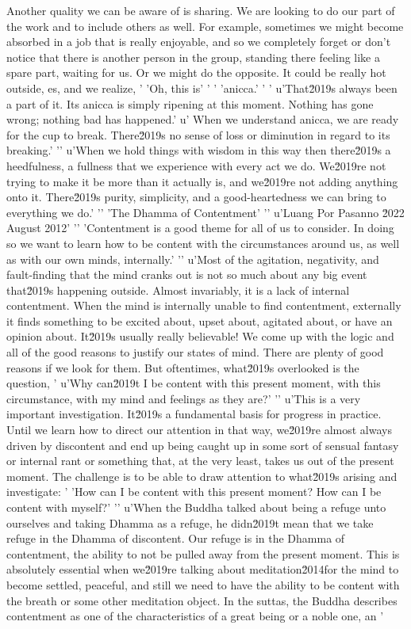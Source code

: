 Another quality we can be aware of is sharing. We are looking to do our 
part of the work and to include others as well. For example, sometimes 
we might become absorbed in a job that is really enjoyable, and so we 
completely forget or don't notice that there is another person in the 
group, standing there feeling like a spare part, waiting for us. Or we 
might do the opposite. It could be really hot outside, es, and we realize, '
'Oh, this is'
' '
'anicca.'
' '
u'That\u2019s always been a part of it. Its anicca is simply ripening at this moment. Nothing has gone wrong; nothing bad has happened.'
u' When we understand anicca, we are ready for the cup to break. There\u2019s no sense of loss or diminution in regard to its breaking.'
'\n'
u'When we hold things with wisdom in this way then there\u2019s a heedfulness, a fullness that we experience with every act we do. We\u2019re not trying to make it be more than it actually is, and we\u2019re not adding anything onto it. There\u2019s purity, simplicity, and a good-heartedness we can bring to everything we do.'
'\n'
'The Dhamma of Contentment'
'\n'
u'Luang Por Pasanno \u2022 August 2012'
'\n'
'Contentment is a good theme for all of us to consider. In doing so we want to learn how to be content with the circumstances around us, as well as with our own minds, internally.'
'\n'
u'Most of the agitation, negativity, and fault-finding that the mind cranks out is not so much about any big event that\u2019s happening outside. Almost invariably, it is a lack of internal contentment. When the mind is internally unable to find contentment, externally it finds something to be excited about, upset about, agitated about, or have an opinion about. It\u2019s usually really believable! We come up with the logic and all of the good reasons to justify our states of mind. There are plenty of good reasons if we look for them. But oftentimes, what\u2019s overlooked is the question, '
u'Why can\u2019t I be content with this present moment, with this circumstance, with my mind and feelings as they are?'
'\n'
u'This is a very important investigation. It\u2019s a fundamental basis for progress in practice. Until we learn how to direct our attention in that way, we\u2019re almost always driven by discontent and end up being caught up in some sort of sensual fantasy or internal rant or something that, at the very least, takes us out of the present moment. The challenge is to be able to draw attention to what\u2019s arising and investigate: '
'How can I be content with this present moment? How can I be content with myself?'
'\n'
u'When the Buddha talked about being a refuge unto ourselves and taking Dhamma as a refuge, he didn\u2019t mean that we take refuge in the Dhamma of discontent. Our refuge is in the Dhamma of contentment, the ability to not be pulled away from the present moment. This is absolutely essential when we\u2019re talking about meditation\u2014for the mind to become settled, peaceful, and still we need to have the ability to be content with the breath or some other meditation object. In the suttas, the Buddha describes contentment as one of the characteristics of a great being or a noble one, an '
